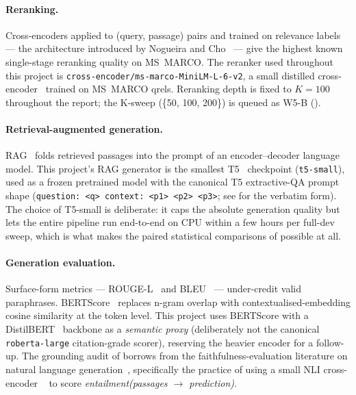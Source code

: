 \documentclass[11pt,a4paper]{article}
\newcommand{\msmarco}{MS~MARCO}
\newcommand{\rougel}{ROUGE-L}
\newcommand{\bertscore}{BERTScore}
\newcommand{\code}[1]{\texttt{#1}}
\begin{document}
\paragraph{Reranking.}  Cross-encoders applied to (query, passage)
pairs and trained on relevance labels --- the architecture introduced
by Nogueira and Cho~\cite{nogueira2019passage} --- give the highest
known single-stage reranking quality on \msmarco{}.  The reranker used
throughout this project is \texttt{cross-encoder/ms-marco-MiniLM-L-6-v2},
a small distilled cross-encoder~\cite{wang2020minilm} trained on
\msmarco{} qrels.  Reranking depth is fixed to $K\!=\!100$ throughout
the report; the K-sweep (\{50, 100, 200\}) is queued as W5-B
().

\paragraph{Retrieval-augmented generation.}  RAG~\cite{lewis2020rag}
folds retrieved passages into the prompt of an encoder--decoder
language model.  This project's RAG generator is the smallest
T5~\cite{raffel2020t5} checkpoint (\texttt{t5-small}), used as a
frozen pretrained model with the canonical T5 extractive-QA prompt
shape (\code{question:~<q>~context:~<p1>~<p2>~<p3>}; see
 for the verbatim form).
The choice of T5-small is deliberate: it caps the absolute generation
quality but lets the entire pipeline run end-to-end on CPU within a
few hours per full-dev sweep, which is what makes the paired
statistical comparisons of  possible at all.

\paragraph{Generation evaluation.}  Surface-form metrics ---
\rougel{}~\cite{lin2004rouge} and
BLEU~\cite{papineni2002bleu} --- under-credit valid paraphrases.
\bertscore{}~\cite{zhang2020bertscore} replaces n-gram overlap with
contextualised-embedding cosine similarity at the token level.  This
project uses BERTScore with a DistilBERT~\cite{sanh2019distilbert}
backbone as a \emph{semantic proxy} (deliberately not the canonical
\texttt{roberta-large} citation-grade scorer), reserving the heavier
encoder for a follow-up.  The grounding audit of 
borrows from the faithfulness-evaluation literature on natural
language generation~\cite{ji2023hallucination,honovich2022true},
specifically the practice of using a small NLI cross-encoder
~\cite{he2023debertav3,williams2018mnli} to score
\emph{entailment(passages $\to$ prediction)}.
\end{document}
